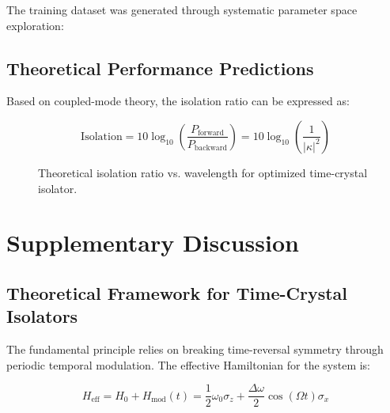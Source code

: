 \documentclass[11pt]{article}
\begin{document}
The training dataset was generated through systematic parameter space exploration:



\subsection{Theoretical Performance Predictions}

Based on coupled-mode theory, the isolation ratio can be expressed as:

\begin{equation}
\text{Isolation} = 10\log_{10}\left(\frac{P_{\text{forward}}}{P_{\text{backward}}}\right) = 10\log_{10}\left(\frac{1}{|\kappa|^2}\right)
\end{equation}

\begin{figure}[h]
\centering
{}
\caption{Theoretical isolation ratio vs. wavelength for optimized time-crystal isolator.}
\label{fig:isolation_spectrum}
\end{figure}

\section{Supplementary Discussion}

\subsection{Theoretical Framework for Time-Crystal Isolators}

The fundamental principle relies on breaking time-reversal symmetry through periodic temporal modulation. The effective Hamiltonian for the system is:

\begin{equation}
H_{\text{eff}} = H_0 + H_{\text{mod}}(t) = \frac{1}{2}\omega_0 \sigma_z + \frac{\Delta\omega}{2}\cos(\Omega t)\sigma_x
\end{equation}
\end{document}

